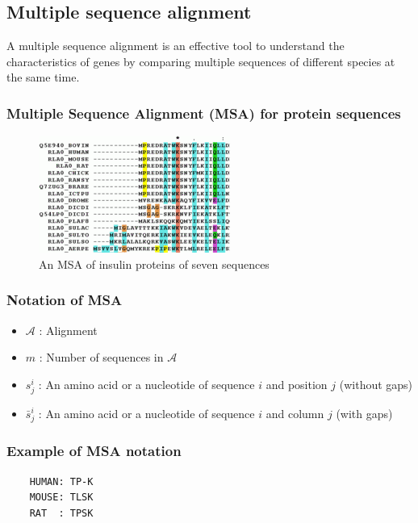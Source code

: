 %
%

%
%
\subsection{Multiple sequence alignment}
A multiple sequence alignment is an effective tool to understand the characteristics of genes by comparing multiple sequences of different species at the same time.

%
%
\subsubsection*{Multiple Sequence Alignment (MSA) for protein sequences}
\begin{figure}[H]
  \centering
      \includegraphics[width=0.3 \textwidth]{fig08/msa_part.png}
  \caption{An MSA of insulin proteins of seven sequences}
\end{figure}

%
%
\subsubsection*{Notation of MSA}
\begin{itemize}
\item $\mathcal{A}$ : Alignment
\item $m$ : Number of sequences in $\mathcal{A}$
\item $s_j^i$ : An amino acid or a nucleotide of sequence $i$ and position $j$ (without gaps)
\item $\bar{s}_j^i$ : An amino acid or a nucleotide of sequence $i$ and column $j$ (with gaps)
\end{itemize}

%
%
\subsubsection*{Example of MSA notation}
\begin{verbatim}
    HUMAN: TP-K
    MOUSE: TLSK
    RAT  : TPSK
\end{verbatim}


